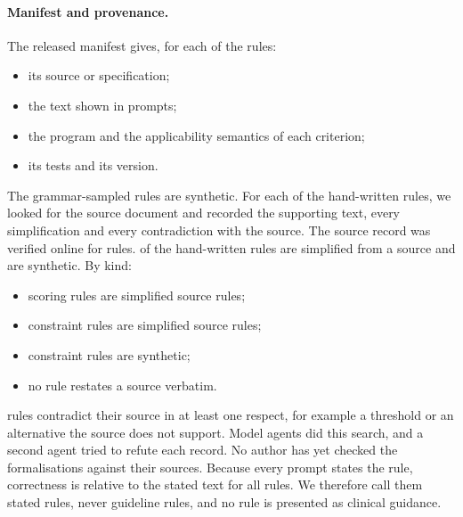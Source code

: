 
\paragraph{Manifest and provenance.}
The released manifest gives, for each of the  rules:
\begin{itemize}
\item its source or specification;
\item the text shown in prompts;
\item the program and the applicability semantics of each criterion;
\item its tests and its version.
\end{itemize}
The  grammar-sampled rules are synthetic.
For each of the  hand-written rules, we looked for the source
document and recorded the supporting text, every simplification and every contradiction with the source.
The source record was verified online for  rules.
 of the
 hand-written rules are simplified from a source and
 are synthetic. By kind:
\begin{itemize}
\item {} scoring rules are
simplified source rules;
\item {} constraint
rules are simplified source rules;
\item {} constraint rules
are synthetic;
\item no rule restates a source verbatim.
\end{itemize}
 rules contradict their source in at least one
respect, for example a threshold or an alternative the source does not support. Model agents did this
search, and a second agent tried to refute each record. No author has yet checked the formalisations
against their sources. Because every prompt states the rule, correctness is relative to the stated text
for all rules. We therefore call them stated rules, never guideline rules, and no rule is presented as
clinical guidance.

